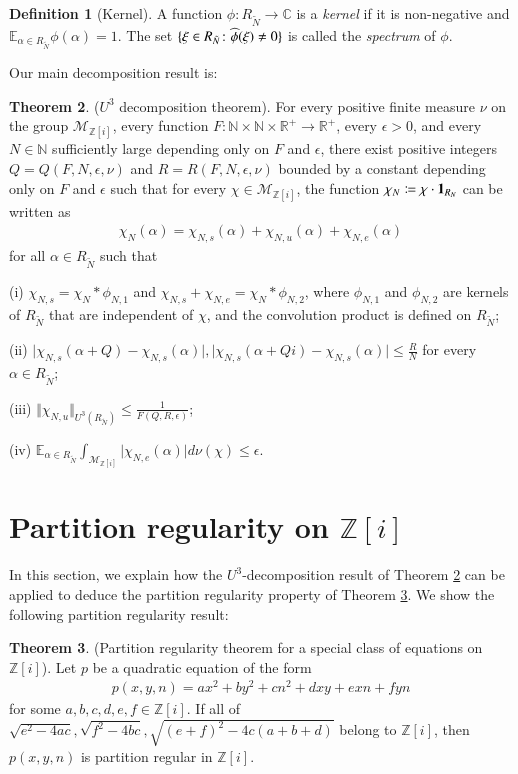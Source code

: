 \documentclass[12pt,amstex]{amsart}
\theoremstyle{definition}
\newtheorem{thm}{Theorem}[section]
\newtheorem{defn}[thm]{Definition}
\def \Z {\mathbb{Z}[i]}
\def \A {\alpha}
\def \e {\epsilon}
\def \R {R_{\tilde{N}}}
\def \x {\bold{\xi}}
\begin{document}
\begin{defn}[Kernel]
A function $\phi\colon \R\rightarrow\mathbb{C}$ is a \emph{kernel} if it is non-negative and $\mathbb{E}_{\A\in\R}\phi(\A)=1$. The set $\{\x\in \R\colon \widehat{\phi}(\x)\neq 0\}$ is called the \emph{spectrum} of $\phi$.
\end{defn}

Our main decomposition result is:

\begin{thm}\label{nU3s}($U^{3}$ decomposition theorem).
  For every positive finite measure $\nu$ on the group $\mathcal{M}_{\Z}$, every function $F\colon\mathbb{N}\times\mathbb{N}\times\mathbb{R}^{+}\rightarrow\mathbb{R}^{+}$, every $\e>0$, and every $N\in\mathbb{N}$ sufficiently large depending only on $F$ and $\e$, there exist positive integers $Q=Q(F,N,\e,\nu)$ and $R=R(F,N,\e,\nu)$ bounded by a constant depending only on $F$ and $\e$ such that for every $\chi\in\mathcal{M}_{\Z}$, the function $\chi_{N}\coloneqq\chi\cdot\bold{1}_{R_{N}}$ can be written as
  \begin{equation}\nonumber
   \begin{split}
     \chi_{N}(\A)=\chi_{N,s}(\A)+\chi_{N,u}(\A)+\chi_{N,e}(\A)
   \end{split}
  \end{equation}
for all $\A\in\R$ such that

  (i) $\chi_{N,s}=\chi_{N}*\phi_{N,1}$ and $\chi_{N,s}+\chi_{N,e}=\chi_{N}*\phi_{N,2}$, where $\phi_{N,1}$ and $\phi_{N,2}$ are kernels of $\R$ that are independent of $\chi$, and the convolution product is defined on $\R$;

  (ii) $\vert\chi_{N,s}(\A+Q)-\chi_{N,s}(\A)\vert, \vert\chi_{N,s}(\A+Qi)-\chi_{N,s}(\A)\vert\leq\frac{R}{N}$ for every $\A\in \R$;

  (iii) $\Vert\chi_{N,u}\Vert_{U^{3}(\R)}\leq\frac{1}{F(Q,R,\e)}$;

  (iv) $\mathbb{E}_{\A\in \R}\int_{\mathcal{M}_{\Z}}\vert\chi_{N,e}(\A)\vert d\nu(\chi)\leq\e$.
\end{thm}

\section{Partition regularity on $\Z$}
In this section, we explain how the $U^{3}$-decomposition result of Theorem \ref{nU3s} can be applied to deduce the partition regularity property of Theorem \ref{c1}. We show the following partition regularity result:
\begin{thm}\label{c1}(Partition regularity theorem for a special class of equations on $\Z$).
  Let $p$ be a quadratic equation of the form
    \begin{equation}\nonumber
    \begin{split}
      p(x,y,n)=ax^{2}+by^{2}+cn^{2}+dxy+exn+fyn
    \end{split}
  \end{equation}
  for some $a,b,c,d,e,f\in\Z$. If all of $\sqrt{e^{2}-4ac}, \sqrt{f^{2}-4bc},\sqrt{(e+f)^{2}-4c(a+b+d)}$ belong to $\Z$, then
  $p(x,y,n)$ is partition regular in $\Z$.
\end{thm}
\end{document}
